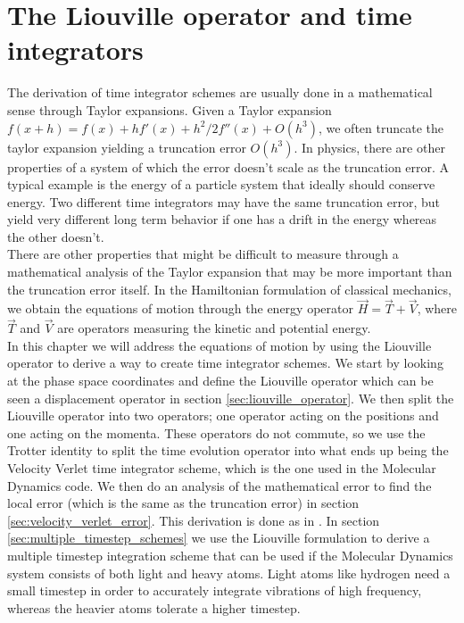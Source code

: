 \chapter{The Liouville operator and time integrators}
\label{app:liouville}
The derivation of time integrator schemes are usually done in a mathematical sense through Taylor expansions. Given a Taylor expansion $f(x+h) = f(x) + hf'(x) + h^2/2f''(x) + O(h^3)$, we often truncate the taylor expansion yielding a truncation error $O(h^3)$. In physics, there are other properties of a system of which the error doesn't scale as the truncation error. A typical example is the energy of a particle system that ideally should conserve energy. Two different time integrators may have the same truncation error, but yield very different long term behavior if one has a drift in the energy whereas the other doesn't.\\
There are other properties that might be difficult to measure through a mathematical analysis of the Taylor expansion that may be more important than the truncation error itself. In the Hamiltonian formulation of classical mechanics, we obtain the equations of motion through the energy operator $\vec H = \vec T + \vec V$, where $\vec T$ and $\vec V$ are operators measuring the kinetic and potential energy.\\
In this chapter we will address the equations of motion by using the Liouville operator to derive a way to create time integrator schemes. We start by looking at the phase space coordinates and define the Liouville operator which can be seen a displacement operator in section \ref{sec:liouville_operator}. We then split the Liouville operator into two operators; one operator acting on the positions and one acting on the momenta. These operators do not commute, so we use the Trotter identity to split the time evolution operator into what ends up being the Velocity Verlet time integrator scheme, which is the one used in the Molecular Dynamics code. We then do an analysis of the mathematical error to find the local error (which is the same as the truncation error) in section \ref{sec:velocity_verlet_error}. This derivation is done as in \cite{frenkel2001understanding}. In section \ref{sec:multiple_timestep_schemes} we use the Liouville formulation to derive a multiple timestep integration scheme that can be used if the Molecular Dynamics system consists of both light and heavy atoms. Light atoms like hydrogen need a small timestep in order to accurately integrate vibrations of high frequency, whereas the heavier atoms tolerate a higher timestep. 

